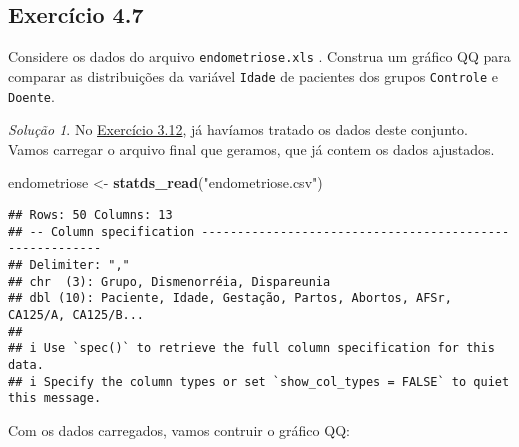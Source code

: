 \documentclass[
]{latex/krantz}
\newenvironment{Shaded}{\begin{snugshade}}{\end{snugshade}}
\newcommand{\DecValTok}[1]{\textcolor[rgb]{0.00,0.00,0.81}{#1}}
\newcommand{\FunctionTok}[1]{\textcolor[rgb]{0.13,0.29,0.53}{\textbf{#1}}}
\newcommand{\NormalTok}[1]{#1}
\newcommand{\OtherTok}[1]{\textcolor[rgb]{0.56,0.35,0.01}{#1}}
\newcommand{\SpecialCharTok}[1]{\textcolor[rgb]{0.81,0.36,0.00}{\textbf{#1}}}
\newcommand{\StringTok}[1]{\textcolor[rgb]{0.31,0.60,0.02}{#1}}
\theoremstyle{definition}
\theoremstyle{definition}
\theoremstyle{definition}
\theoremstyle{definition}
\theoremstyle{remark}
\newtheorem*{solution}{Solução}
\begin{document}
\hypertarget{exr4-7}{%
\subsection*{Exercício 4.7}\label{exr4-7}}

Considere os dados do arquivo \texttt{endometriose.xls} \citep{AbraoEtAl1997}. Construa um gráfico QQ para comparar as distribuições da variável \texttt{Idade} de pacientes dos grupos \texttt{Controle} e \texttt{Doente}.

\begin{solution}
No \protect\hyperlink{exr3-12}{Exercício 3.12}, já havíamos tratado os dados deste conjunto. Vamos carregar o arquivo final que geramos, que já contem os dados ajustados.

\begin{Shaded}
\begin{Highlighting}[]
\NormalTok{endometriose }\OtherTok{\textless{}{-}} \FunctionTok{statds\_read}\NormalTok{(}\StringTok{"endometriose.csv"}\NormalTok{)}
\end{Highlighting}
\end{Shaded}

\begin{verbatim}
## Rows: 50 Columns: 13
## -- Column specification --------------------------------------------------------
## Delimiter: ","
## chr  (3): Grupo, Dismenorréia, Dispareunia
## dbl (10): Paciente, Idade, Gestação, Partos, Abortos, AFSr, CA125/A, CA125/B...
## 
## i Use `spec()` to retrieve the full column specification for this data.
## i Specify the column types or set `show_col_types = FALSE` to quiet this message.
\end{verbatim}

Com os dados carregados, vamos contruir o gráfico QQ:

\begin{Shaded}
\end{Shaded}
\end{solution}
\end{document}
